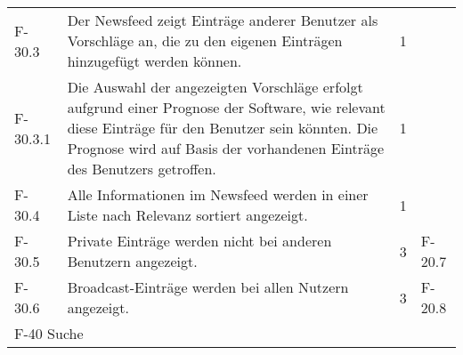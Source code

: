 \begin{tabularx}{\textwidth}{|l|X|l|l|}
    F-30.3 & Der Newsfeed zeigt Einträge anderer Benutzer als Vorschläge an, die zu den eigenen Einträgen hinzugefügt werden können. & 1 & \\
    F-30.3.1 & Die Auswahl der angezeigten Vorschläge erfolgt aufgrund einer Prognose der Software, wie relevant diese Einträge für den Benutzer sein könnten. Die Prognose wird auf Basis der vorhandenen Einträge des Benutzers getroffen. & 1 & \\
    F-30.4 & Alle Informationen im Newsfeed werden in einer Liste nach Relevanz sortiert angezeigt. & 1 & \\
    F-30.5 & Private Einträge werden nicht bei anderen Benutzern angezeigt. & 3 & F-20.7 \\
    F-30.6 & Broadcast-Einträge werden bei allen Nutzern angezeigt. & 3 & F-20.8 \\
    \hline
    \multicolumn{4}{|l|}{F-40 Suche}\\

    



\end{tabularx}
